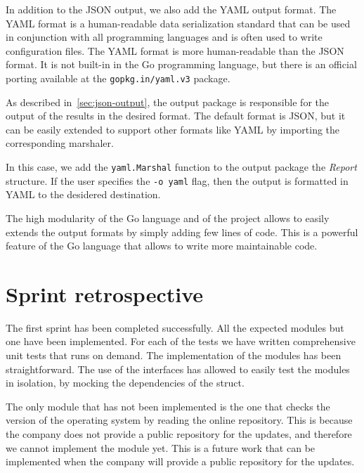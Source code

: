 In addition to the JSON output, we also add the YAML output format. The YAML format is a human-readable data serialization standard that can be used in conjunction with all programming languages and is often used to write configuration files. The YAML format is more human-readable than the JSON format. It is not built-in in the Go programming language, but there is an official porting available at the \texttt{gopkg.in/yaml.v3} package.

As described in~\cref{sec:json-output}, the output package is responsible for the output of the results in the desired format. The default format is JSON, but it can be easily extended to support other formats like YAML by importing the corresponding marshaler.

In this case, we add the \texttt{yaml.Marshal} function to the output package the \textit{Report} structure. If the user specifies the \texttt{-o yaml} flag, then the output is formatted in YAML to the desidered destination.

The high modularity of the Go language and of the project allows to easily extends the output formats by simply adding few lines of code. This is a powerful feature of the Go language that allows to write more maintainable code.

\section{Sprint retrospective}

The first sprint has been completed successfully. All the expected modules but one have been implemented. For each of the tests we have written comprehensive unit tests that runs on demand. The implementation of the modules has been straightforward. The use of the interfaces has allowed to easily test the modules in isolation, by mocking the dependencies of the struct.

The only module that has not been implemented is the one that checks the version of the operating system by reading the online repository. This is because the company does not provide a public repository for the updates, and therefore we cannot implement the module yet. This is a future work that can be implemented when the company will provide a public repository for the updates.


